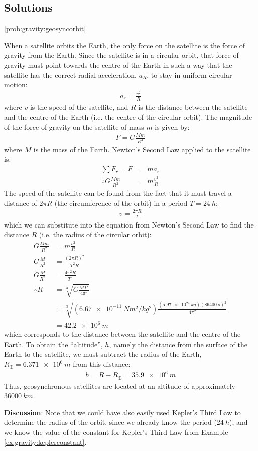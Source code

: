\subsection{Solutions}
\begin{solution}{\ref{prob:gravity:geosyncorbit}}
{When a satellite orbits the Earth, the only force on the satellite is the force of gravity from the Earth. Since the satellite is in a circular orbit, that force of gravity must point towards the centre of the Earth in such a way that the satellite has the correct radial acceleration, $a_R$, to stay in uniform circular motion:
\begin{align*}
a_r=\frac{v^2}{R}
\end{align*}
where $v$ is the speed of the satellite, and $R$ is the distance between the satellite and the centre of the Earth (i.e. the centre of the circular orbit). The magnitude of the force of gravity on the satellite of mass $m$ is given by:
\begin{align*}
F = G\frac{Mm}{R^2}
\end{align*}
where $M$ is the mass of the Earth. Newton's Second Law applied to the satellite is:
\begin{align*}
\sum F_r = F &= ma_r\\
\therefore G\frac{Mm}{R^2}&=m\frac{v^2}{R}
\end{align*}
The speed of the satellite can be found from the fact that it must travel a distance of $2\pi R$ (the circumference of the orbit) in a period $T=\SI{24}{h}$:
\begin{align*}
v=\frac{2\pi R}{T}
\end{align*}
which we can substitute into the equation from Newton's Second Law to find the distance $R$ (i.e. the radius of the circular orbit):
\begin{align*}
G\frac{Mm}{R^2}&=m\frac{v^2}{R}\\
G\frac{M}{R^2}&=\frac{(2\pi R)^2}{T^2R}\\ 
G\frac{M}{R^2}&=\frac{4\pi^2 R}{T^2}\\ 
\therefore R&=\sqrt[3]{G\frac{MT^2}{4\pi^2}}\\
&=\sqrt[3]{(\SI{6.67e-11}{Nm^2/kg^2})\frac{(\SI{5.97e24}{kg})(\SI{86400}{s})^2}{4\pi^2}}\\
&=\SI{42.2e6}{m}
\end{align*}
which corresponds to the distance between the satellite and the centre of the Earth. To obtain the ``altitude'', $h$, namely the distance from the surface of the Earth to the satellite, we must subtract the radius of the Earth, $R_\oplus=\SI{6.371e6}{m}$ from this distance:
\begin{align*}
h = R-R_\oplus = \SI{35.9e6}{m}
\end{align*}
Thus, geosynchronous satellites are located at an altitude of approximately $\SI{36000}{km}$.

\textbf{Discussion}: Note that we could have also easily used Kepler's Third Law to determine the radius of the orbit, since we already know the period ($\SI{24}{h}$), and we know the value of the constant for Kepler's Third Law from Example \ref{ex:gravity:keplerconstant}.
}
\end{solution}

